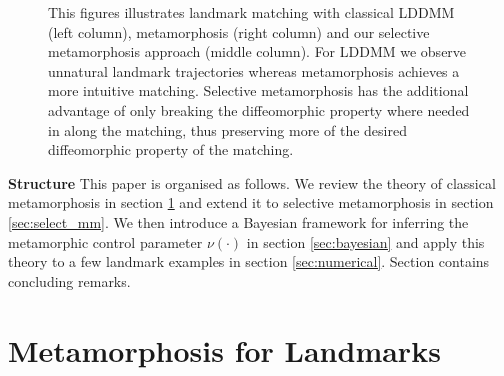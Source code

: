 \documentclass[runningheads]{llncs}
\begin{document}
\begin{figure}
\begin{minipage}{\textwidth}
    \caption{This figures illustrates landmark matching with classical LDDMM
    (left column), metamorphosis (right column) and our selective metamorphosis
    approach (middle column). For LDDMM we observe unnatural landmark
    trajectories whereas metamorphosis achieves a more intuitive matching.
    Selective metamorphosis has the additional advantage of only breaking the
    diffeomorphic property where needed in along the matching, thus preserving
    more of the desired diffeomorphic property of the matching.}
    \label{fig:mm_lddmm}
\end{minipage}
\end{figure}

{\bf Structure} This paper is organised as follows. We review the theory of
classical metamorphosis in section \ref{sec:bg} and extend it to selective
metamorphosis in section \ref{sec:select_mm}.  We then introduce a Bayesian
framework for inferring the metamorphic control parameter $\nu(\cdot)$ in
section \ref{sec:bayesian} and apply this theory to a few landmark examples in
section \ref{sec:numerical}. Section \label{sec:outlook} contains concluding
remarks.

\section{Metamorphosis for Landmarks}\label{sec:bg}
\end{document}
